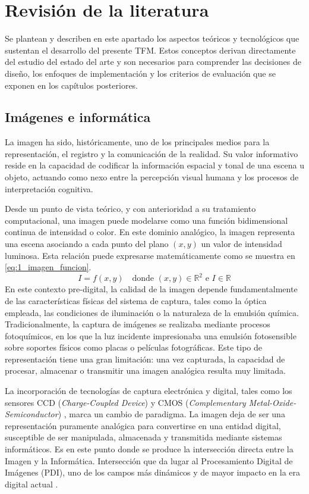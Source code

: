 \section{Revisión de la literatura} \label{sec:3_revision_literatura}
Se plantean y describen en este apartado los aspectos teóricos y tecnológicos que sustentan 
el desarrollo del presente TFM. Estos conceptos derivan directamente del estudio del estado del 
arte y son necesarios para comprender las decisiones de diseño, los enfoques de implementación
y los criterios de evaluación que se exponen en los capítulos posteriores.

\subsection{Imágenes e informática} \label{subsec:3_1_imagenes_informatica}
La imagen ha sido, históricamente, uno de los principales medios para la representación, 
el registro y la comunicación de la realidad. Su valor informativo reside en la capacidad de 
codificar la información espacial y tonal de una escena u objeto, actuando como nexo entre 
la percepción visual humana y los procesos de interpretación cognitiva.

Desde un punto de vista teórico, y con anterioridad a su tratamiento computacional, una imagen
puede modelarse como una función bidimensional continua de intensidad o color. En este dominio 
analógico, la imagen representa una escena asociando a cada punto del plano $(x, y)$ un valor de 
intensidad luminosa. Esta relación puede expresarse matemáticamente como se muestra en \eqref{eq:1_imagen_funcion}.
\begin{equation}
    I = f(x,y) \quad \text{donde } (x,y) \in \mathbb{R}^2 \text{ e } I \in \mathbb{R}
    \label{eq:1_imagen_funcion}
\end{equation}
En este contexto pre-digital, la calidad de la imagen depende fundamentalmente de 
las características físicas del sistema de captura, tales como la óptica empleada, las condiciones de iluminación 
o la naturaleza de la emulsión química. Tradicionalmente, la captura de imágenes se realizaba mediante procesos 
fotoquímicos, en los que la luz incidente impresionaba una emulsión fotosensible sobre soportes físicos como 
placas o películas fotográficas. Este tipo de representación tiene una gran limitación: una vez capturada, la capacidad 
de procesar, almacenar o transmitir una imagen analógica resulta muy limitada.

La incorporación de tecnologías de captura electrónica y digital, tales como los sensores 
CCD (\textit{Charge-Coupled Device}) y CMOS (\textit{Complementary Metal-Oxide-Semiconductor})
\cite{ccd_cmos}, marca un cambio de paradigma. La imagen deja de ser 
una representación puramente analógica para convertirse en una entidad digital, 
susceptible de ser manipulada, almacenada y transmitida mediante sistemas informáticos. Es en 
este punto donde se produce la intersección directa entre la Imagen y la Informática. Intersección que
da lugar al Procesamiento Digital de Imágenes (PDI), uno de los campos más dinámicos y de mayor 
impacto en la era digital actual \cite{pdi}.

